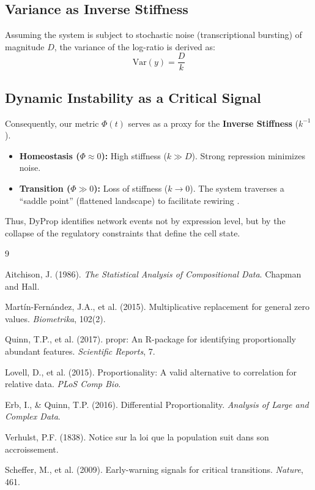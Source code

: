 \documentclass[11pt, a4paper]{article}
\begin{document}
\subsection{Variance as Inverse Stiffness}
Assuming the system is subject to stochastic noise (transcriptional bursting) of magnitude $D$, the variance of the log-ratio is derived as:
\begin{equation}
    \text{Var}(y) = \frac{D}{k}
\end{equation}

\subsection{Dynamic Instability as a Critical Signal}
Consequently, our metric $\Phi(t)$ serves as a proxy for the \textbf{Inverse Stiffness} ($k^{-1}$).
\begin{itemize}
    \item \textbf{Homeostasis ($\Phi \approx 0$):} High stiffness ($k \gg D$). Strong repression minimizes noise.
    \item \textbf{Transition ($\Phi \gg 0$):} Loss of stiffness ($k \to 0$). The system traverses a ``saddle point'' (flattened landscape) to facilitate rewiring \citep{scheffer2009}.
\end{itemize}
Thus, DyProp identifies network events not by expression level, but by the collapse of the regulatory constraints that define the cell state.

\begin{thebibliography}{9}

Aitchison, J. (1986).
\textit{The Statistical Analysis of Compositional Data}. Chapman and Hall.

Martín-Fernández, J.A., et al. (2015).
Multiplicative replacement for general zero values. \textit{Biometrika}, 102(2).

Quinn, T.P., et al. (2017).
propr: An R-package for identifying proportionally abundant features. \textit{Scientific Reports}, 7.

Lovell, D., et al. (2015).
Proportionality: A valid alternative to correlation for relative data. \textit{PLoS Comp Bio}.

Erb, I., \& Quinn, T.P. (2016).
Differential Proportionality. \textit{Analysis of Large and Complex Data}.

Verhulst, P.F. (1838).
Notice sur la loi que la population suit dans son accroissement.

Scheffer, M., et al. (2009).
Early-warning signals for critical transitions. \textit{Nature}, 461.

\end{thebibliography}
\end{document}
